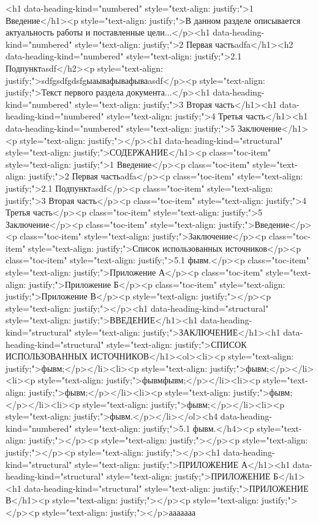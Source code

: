 \documentclass[paper=a4, fontsize=14pt, pagesize, DIV=calc, oneside]{scrreport}
\begin{document}
\pagestyle{empty} 



\newpage
\tableofcontents
\newpage

\pagestyle{plain}
\setcounter{page}{2} 


<h1 data-heading-kind="numbered" style="text-align: justify;">1 Введение</h1><p style="text-align: justify;">В данном разделе описывается актуальность работы и поставленные цели...</p><h1 data-heading-kind="numbered" style="text-align: justify;">2 Первая частьadfa</h1><h2 data-heading-kind="numbered" style="text-align: justify;">2.1 Подпунктasdf</h2><p style="text-align: justify;">sdfgsdfgdsfgыаывафывафываasdf</p><p style="text-align: justify;">Текст первого раздела документа...</p><h1 data-heading-kind="numbered" style="text-align: justify;">3 Вторая часть</h1><h1 data-heading-kind="numbered" style="text-align: justify;">4 Третья часть</h1><h1 data-heading-kind="numbered" style="text-align: justify;">5 Заключение</h1><p style="text-align: justify;"></p><h1 data-heading-kind="structural" style="text-align: justify;">СОДЕРЖАНИЕ</h1><p class="toc-item" style="text-align: justify;">1 Введение</p><p class="toc-item" style="text-align: justify;">2 Первая частьadfa</p><p class="toc-item" style="text-align: justify;">2.1 Подпунктasdf</p><p class="toc-item" style="text-align: justify;">3 Вторая часть</p><p class="toc-item" style="text-align: justify;">4 Третья часть</p><p class="toc-item" style="text-align: justify;">5 Заключение</p><p class="toc-item" style="text-align: justify;">Введение</p><p class="toc-item" style="text-align: justify;">Заключение</p><p class="toc-item" style="text-align: justify;">Список использованных источников</p><p class="toc-item" style="text-align: justify;">5.1 фывм.</p><p class="toc-item" style="text-align: justify;">Приложение А</p><p class="toc-item" style="text-align: justify;">Приложение Б</p><p class="toc-item" style="text-align: justify;">Приложение В</p><p style="text-align: justify;"></p><p style="text-align: justify;"></p><h1 data-heading-kind="structural" style="text-align: justify;">ВВЕДЕНИЕ</h1><h1 data-heading-kind="structural" style="text-align: justify;">ЗАКЛЮЧЕНИЕ</h1><h1 data-heading-kind="structural" style="text-align: justify;">СПИСОК ИСПОЛЬЗОВАННЫХ ИСТОЧНИКОВ</h1><ol><li><p style="text-align: justify;">фывм;</p></li><li><p style="text-align: justify;">фывм;</p></li><li><p style="text-align: justify;">фывмфывм;</p></li><li><p style="text-align: justify;">фывм;</p></li><li><p style="text-align: justify;">фывм;</p></li><li><p style="text-align: justify;">фывм;</p></li><li><p style="text-align: justify;">фывм.</p></li></ol><h4 data-heading-kind="numbered" style="text-align: justify;">5.1 фывм.</h4><p style="text-align: justify;"></p><p style="text-align: justify;"></p><p style="text-align: justify;"></p><p style="text-align: justify;"></p><h1 data-heading-kind="structural" style="text-align: justify;">ПРИЛОЖЕНИЕ А</h1><h1 data-heading-kind="structural" style="text-align: justify;">ПРИЛОЖЕНИЕ Б</h1><h1 data-heading-kind="structural" style="text-align: justify;">ПРИЛОЖЕНИЕ В</h1><p style="text-align: justify;"></p><p style="text-align: justify;"></p><p style="text-align: justify;"></p>ааааааа


\newpage
\printbibliography[heading=bibintoc, title={Список использованных источников}]
\end{document}
